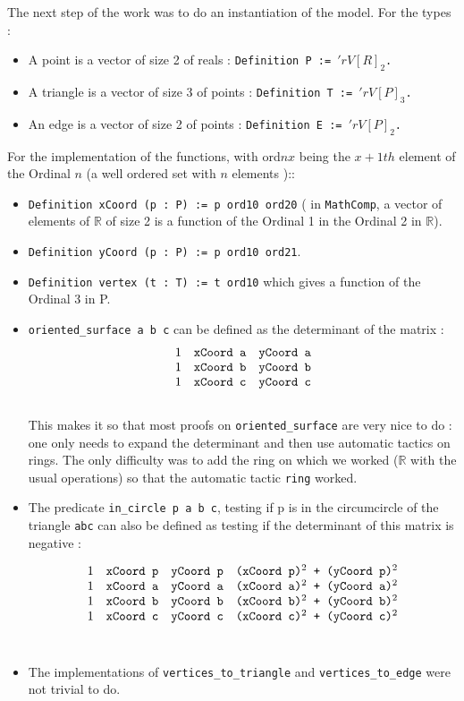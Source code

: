 \documentclass[a4paper,10pt]{article}
\begin{document}
The next step of the work was to do an instantiation of the model. For the types :
\begin{itemize}
\item A point is a vector of size 2 of reals : {\tt Definition P := $'rV[R]_2$. }
\item A triangle is a vector of size 3 of points : {\tt Definition T := $'rV[P]_3$. }
\item An edge is a vector of size 2 of points : {\tt Definition E := $'rV[P]_2$. }
\end{itemize}
For the implementation of the functions, with ord$nx$ being the $x+1{th}$ element of the Ordinal $n$ (a well ordered set with $n$ elements )::
\begin{itemize}
  \item {\tt Definition xCoord (p : P) := p ord10 ord20} ( in {\tt MathComp}, a vector of elements of $\mathbb{R}$ of size 2 is a function of the Ordinal 1 in the Ordinal 2 in $\mathbb{R}$). 
  \item {\tt Definition yCoord (p : P) := p ord10 ord21}.
   \item {\tt Definition vertex (t : T) := t ord10} which gives a function of the Ordinal 3 in P.
\item {\tt oriented\_surface a b c} can be defined as the determinant of the matrix :
  $$\begin{matrix}
1 & \text{{\tt xCoord  a}} & \text{{\tt yCoord  a}}\\
1 & \text{{\tt xCoord  b}} & \text{{\tt yCoord  b}}\\
1 & \text{{\tt xCoord  c}} & \text{{\tt yCoord  c}}
\end{matrix}$$\\
This makes it so that most proofs on {\tt oriented\_surface} are very nice to do : one only needs to expand the determinant and then use automatic tactics on rings. The only difficulty was to add the ring on which we worked ($\mathbb{R}$ with the usual operations) so that the automatic tactic {\tt ring} worked.

\item The predicate {\tt in\_circle p a b c}, testing if p is in the circumcircle of the triangle {\tt abc} can also be defined as testing if the determinant of this matrix is negative :

  $$\begin{matrix}
1 & \text{{\tt xCoord  p}} & \text{{\tt yCoord  p}}& \text{{\tt (xCoord  p)$^2$ + (yCoord  p)$^2$}}\\
1 & \text{{\tt xCoord  a}} & \text{{\tt yCoord  a}}& \text{{\tt (xCoord  a)$^2$ + (yCoord  a)$^2$}}\\
1 & \text{{\tt xCoord  b}} & \text{{\tt yCoord  b}}& \text{{\tt (xCoord  b)$^2$ + (yCoord  b)$^2$}}\\
1 & \text{{\tt xCoord  c}} & \text{{\tt yCoord  c}}& \text{{\tt (xCoord  c)$^2$ + (yCoord  c)$^2$}}
\end{matrix}$$\\
\item The implementations of {\tt vertices\_to\_triangle} and {\tt vertices\_to\_edge} were not trivial to do.


\end{itemize}
\end{document}
